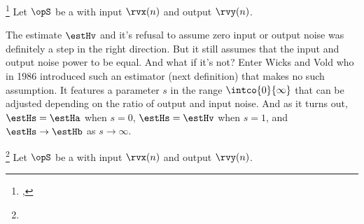 \begin{definition}
\footnote{
  ,
  }
\label{def:Hv}
Let $\opS$ be a  with input $\rvx(n)$ and output $\rvy(n)$.
\end{definition}

The estimate $\estHv$ and it's refusal to assume zero input or output noise
was definitely a step in the right direction.
But it still assumes that the input and output noise power to be equal.
And what if it's not?
Enter Wicks and Vold who in 1986 introduced such an estimator (next definition)
that makes no such assumption.
It features a parameter $s$ in the range $\intco{0}{\infty}$
that can be adjusted depending on the ratio of output and input noise.
And as it turns out, $\estHs = \estHa$ when $s=0$, $\estHs=\estHv$ when $s=1$, and
$\estHs\to\estHb$ as $s\to\infty$. %
\begin{definition}
\footnote{
  }
\label{def:Hs}
Let $\opS$ be a  with input $\rvx(n)$ and output $\rvy(n)$.
\end{definition}

